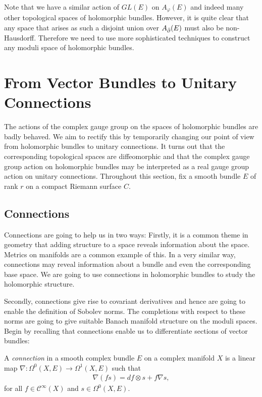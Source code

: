 \documentclass[12pt]{ociamthesis}  %
\begin{document}
Note that we have a similar action of $GL(E)$ on $A_\varphi(E)$ and
indeed many other topological spaces of holomorphic bundles. However,
it is quite clear that any space that arises as such a disjoint union
over $A_{\bar{\partial}} (E)$ must also be non-Hausdorff. Therefore we need
to use more sophisticated techniques to construct any moduli
space of holomorphic bundles.

\section{From Vector Bundles to Unitary Connections}

The actions of the complex gauge group on the spaces of holomorphic
bundles are badly behaved. We aim to rectify this by temporarily
changing our point of view from holomorphic bundles to unitary
connections. It turns out that the corresponding topological spaces
are diffeomorphic and that the complex gauge group action on holomorphic bundles
may be interpreted as a real gauge group action on unitary connections.
Throughout this section, fix a smooth bundle $E$ of rank $r$ on a compact
Riemann surface $C$.

\subsection{Connections}

Connections are going to help us in two ways: Firstly, it is a common
theme in geometry that adding structure to a space
reveals information about the space. Metrics on manifolds are a common
example of this. In a very similar way, connections may reveal
information about a bundle and even the corresponding base space.
We are going to use connections in holomorphic bundles to study
the holomorphic structure.

Secondly, connections give rise to covariant derivatives and hence are
going to enable the definition of Sobolev norms. The completions
with respect to these norms are going to give suitable Banach
manifold structure on the moduli spaces.
Begin by recalling that connections enable us to differentiate sections of
vector bundles:

\begin{definition}
  A \emph{connection} in a smooth complex bundle $E$ on
  a complex manifold $X$ is a linear map
  $\nabla : \Omega^0(X,E) \to \Omega^1(X,E)$
  such that
  \begin{align*}
    \nabla (fs) = df \otimes s + f\nabla s,
  \end{align*}
  for all $f\in \mathscr C^\infty(X)$ and $s\in\Omega^0(X,E)$.
\end{definition}
\end{document}
